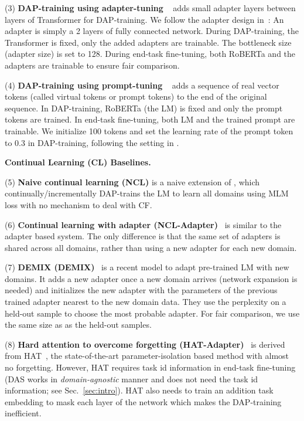 \documentclass{article} \usepackage{iclr2023_conference,times}
\begin{document}
(3) \textbf{DAP-training using adapter-tuning }~\cite{madotto2020continual,Houlsby2019Parameter} adds small adapter layers between layers of Transformer for DAP-training. We follow the adapter design in~\cite{madotto2020continual,Houlsby2019Parameter}: An adapter is simply a 2 layers of fully connected network. During DAP-training, the Transformer is fixed, only the added adapters are trainable. The bottleneck size (adapter size) is set to 128. 
During end-task fine-tuning, both RoBERTa and the adapters are trainable to ensure fair comparison.


(4) \textbf{DAP-training using prompt-tuning }~\cite{DBLP:conf/emnlp/LesterAC21} adds a sequence of real vector tokens (called virtual tokens or prompt tokens) to the end of the original sequence. In DAP-training, RoBERTa (the LM) is fixed and only the prompt tokens are trained. In end-task fine-tuning, both LM and the trained prompt are trainable. We initialize 100 tokens and set the learning rate of the prompt token to 0.3 in DAP-training, following the setting in \cite{DBLP:conf/emnlp/LesterAC21}. 




\vspace{+2mm}
\noindent
\textbf{Continual Learning (CL) Baselines.}

(5) \textbf{Naive continual learning (NCL)} is a naive extension of \cite{DBLP:conf/acl/GururanganMSLBD20}, which continually/incrementally DAP-trains the LM to learn all domains using MLM loss with no mechanism to deal with CF.

(6) \textbf{Continual learning with adapter (NCL-Adapter)}~\cite{Houlsby2019Parameter} is similar to the adapter based system. The only difference is that the same set of adapters is shared across all domains, rather than using a new adapter for each new domain.

(7) \textbf{DEMIX (DEMIX)}~\cite{gururangan2021demix} is a recent model to adapt pre-trained LM with new domains. It adds a new adapter once a new domain arrives (network expansion is needed) and initializes the new adapter with the parameters of the previous trained adapter nearest to the new domain data. They use the perplexity on a held-out sample to choose the most probable adapter. For fair comparison, we use the same size as  as the held-out samples.

(8) \textbf{Hard attention to overcome forgetting (HAT-Adapter)}~\cite{ke2021adapting} is derived from HAT~\cite{Serra2018overcoming}, the state-of-the-art parameter-isolation based method with almost no forgetting. However, HAT requires task id information in end-task fine-tuning (DAS works in \textit{domain-agnostic} manner and does not need the task id information; see Sec.~\ref{sec:intro}). HAT also needs to train an addition task embedding to mask each layer of the network which makes the DAP-training inefficient. 
\end{document}
